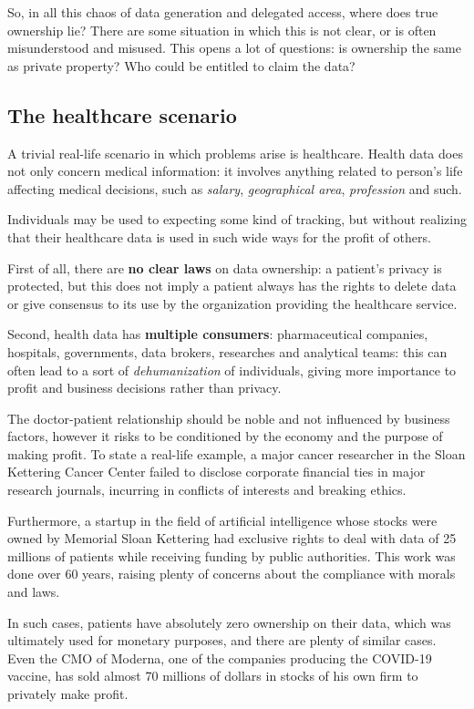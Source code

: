 \documentclass[12pt]{article}
\begin{document}
	So, in all this chaos of data generation and delegated  access, where does true ownership lie? There are some situation in which this is not clear, or is often misunderstood and misused. This opens a lot of questions: is ownership the same as private property? Who could be entitled to claim the data? 
	
	\subsection{The healthcare scenario}
	A trivial real-life scenario in which problems arise is healthcare. Health data does not only concern medical information: it involves anything related to person's life affecting medical decisions, such as \textit{salary}, \textit{geographical area}, \textit{profession} and such. 
	
	Individuals may be used to expecting some kind of tracking, but without realizing that their healthcare data is used in such wide ways for the profit of others.
	
	First of all, there are \textbf{no clear laws} on data ownership: a patient's privacy is protected, but this does not imply a patient always has the rights to delete data or give consensus to its use by the organization providing the healthcare service.
	
	Second, health data has \textbf{multiple consumers}: pharmaceutical companies, hospitals, governments, data brokers, researches and analytical teams: this can often lead to a sort of \textit{dehumanization} of individuals, giving more importance to profit and business decisions rather than privacy.
	
	The doctor-patient relationship should be noble and not influenced by business factors, however it risks to be conditioned by the economy and the purpose of making profit. To state a real-life example, a major cancer researcher in the Sloan Kettering Cancer Center failed to disclose corporate financial ties in major research journals, incurring in conflicts of interests and breaking ethics\cite{nytimes}. 
	
	Furthermore, a startup in the field of artificial intelligence whose stocks were owned by Memorial Sloan Kettering had exclusive rights to deal with data of 25 millions of patients while receiving funding by public authorities. This work was done over 60 years, raising plenty of concerns about the compliance with morals and laws.
	
	In such cases, patients have absolutely zero ownership on their data, which was ultimately used for monetary purposes, and there are plenty of similar cases. Even the CMO of Moderna, one of the companies producing the COVID-19 vaccine, has sold almost 70 millions of dollars in stocks of his own firm to privately make profit\cite{moderna}.
	
\end{document}
